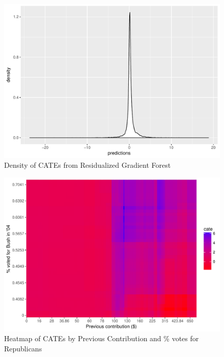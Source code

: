 \documentclass{article}
\begin{document}
\begin{figure}[!ht]
\center
\caption{Density of CATEs from Residualized Gradient Forest}
\label{gfdens}
\includegraphics[scale=.8]{cate_gf.pdf}
\end{figure}
 
 \begin{figure}[!ht]
\center
\caption{Heatmap of CATEs by Previous Contribution and \% votes for Republicans}
\label{heatmap}
\includegraphics[scale=.8]{heatmap.pdf}
\end{figure}
 
\end{document}
